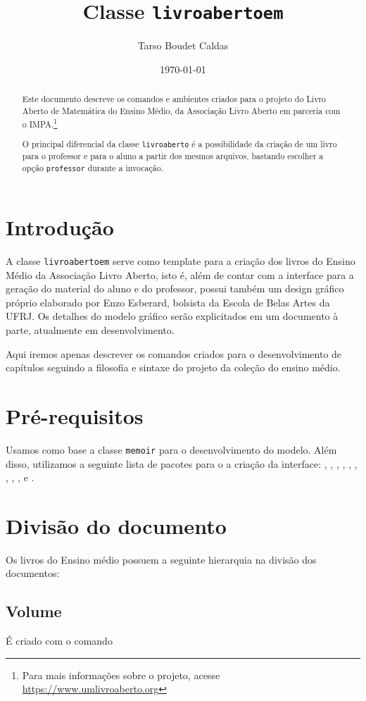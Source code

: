 \documentclass{article}
\title{Classe \texttt{livroabertoem}}
\author{Tarso Boudet Caldas}
\date{\today}
\begin{document}
\begin{abstract}
	Este documento descreve os comandos e ambientes criados para o projeto do
	Livro Aberto de Matemática do Ensino Médio, da Associação Livro Aberto em
	parceria com o IMPA.\footnote{Para mais informações sobre o projeto, acesse
		\url{https://www.umlivroaberto.org}}

	O principal diferencial da classe \verb|livroaberto| é a possibilidade
	da criação de um livro para o professor e para o aluno a partir dos
	mesmos arquivos, bastando escolher a opção \verb|professor| durante a
	invocação.
\end{abstract}

\section{Introdução}

A classe \verb|livroabertoem| serve como template para a criação dos
livros do Ensino Médio da Associação Livro Aberto, isto é, além de
contar com a interface para a geração do material do aluno e do
professor, possui também um design gráfico próprio elaborado por Enzo
Esberard, bolsista da Escola de Belas Artes da UFRJ\@. Os detalhes do
modelo gráfico serão explicitados em um documento à parte, atualmente
em desenvolvimento.

Aqui iremos apenas descrever os comandos criados para o desenvolvimento
de capítulos seguindo a filosofia e sintaxe do projeto da coleção do
ensino médio.

\section{Pré-requisitos}

Usamos como base a classe \verb|memoir| para o desenvolvimento do
modelo. Além disso, utilizamos a seguinte lista de pacotes para o a
criação da interface: , ,
, ,
, ,
, ,
,  e .


\section{Divisão do documento}

Os livros do Ensino médio possuem a seguinte hierarquia na divisão dos documentos: 

\subsection{Volume}

É criado com o comando \volume{}
\end{document}
